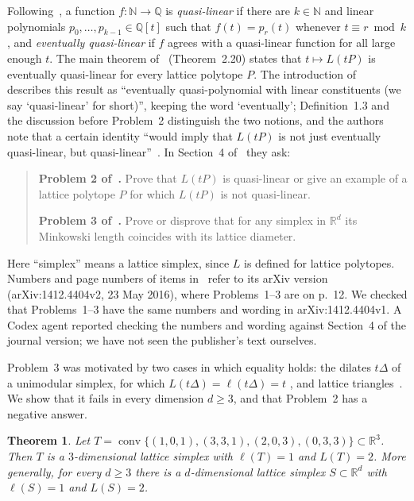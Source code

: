 \documentclass[11pt]{article}
\newtheorem{theorem}{Theorem}
\theoremstyle{definition}
\theoremstyle{remark}
\newcommand{\R}{\mathbb R}
\newcommand{\Q}{\mathbb Q}
\newcommand{\N}{\mathbb N}
\DeclareMathOperator{\conv}{conv}
\begin{document}
Following~\cite[Definition~1.3]{ss}, a function $f\colon\N\to\Q$ is
\emph{quasi-linear} if there are $k\in\N$ and linear polynomials
$p_0,\dots,p_{k-1}\in\Q[t]$ such that $f(t)=p_r(t)$ whenever $t\equiv r\bmod
k$, and \emph{eventually quasi-linear} if $f$ agrees with a quasi-linear
function for all large enough $t$. The main theorem of~\cite{ss}
(Theorem~2.20) states that $t\mapsto L(tP)$ is eventually quasi-linear for
every lattice polytope $P$. The introduction of~\cite{ss} describes this
result as ``eventually quasi-polynomial with linear constituents (we say
`quasi-linear' for short)'', keeping the word `eventually'; Definition~1.3 and
the discussion before Problem~2 distinguish the two notions, and the authors
note that a certain identity ``would imply that $L(tP)$ is not just
eventually quasi-linear, but quasi-linear''~\cite[p.~12]{ss}. In Section~4
of~\cite{ss} they ask:

\begin{quote}
\textbf{Problem 2 of~\cite{ss}.} Prove that $L(tP)$ is quasi-linear or give an
example of a lattice polytope $P$ for which $L(tP)$ is not quasi-linear.

\textbf{Problem 3 of~\cite{ss}.} Prove or disprove that for any simplex in
$\R^d$ its Minkowski length coincides with its lattice diameter.
\end{quote}

\noindent Here ``simplex'' means a lattice simplex, since $L$ is defined for
lattice polytopes. Numbers and page numbers of items in~\cite{ss} refer to
its arXiv version (arXiv:1412.4404v2, 23 May 2016), where Problems~1--3 are
on p.~12. We checked
that Problems~1--3 have the same numbers and wording in arXiv:1412.4404v1. A
Codex agent reported checking the numbers and wording against Section~4 of
the journal version; we have not seen the publisher's text ourselves.

Problem~3 was motivated by two cases in which equality holds: the dilates
$t\Delta$ of a unimodular simplex, for which $L(t\Delta)=\ell(t\Delta)=t$
\cite[Theorem~2.1, Example~2.6]{ss}, and lattice triangles~\cite[Corollary~3.2]{ss}.
We show that it fails in every dimension $d\ge3$, and that Problem~2 has a
negative answer.

\begin{theorem}\label{thm:diam}
Let $T=\conv\{(1,0,1),(3,3,1),(2,0,3),(0,3,3)\}\subset\R^3$. Then $T$ is a
$3$-dimensional lattice simplex with $\ell(T)=1$ and $L(T)=2$. More generally,
for every $d\ge3$ there is a $d$-dimensional lattice simplex $S\subset\R^d$
with $\ell(S)=1$ and $L(S)=2$.
\end{theorem}
\end{document}
